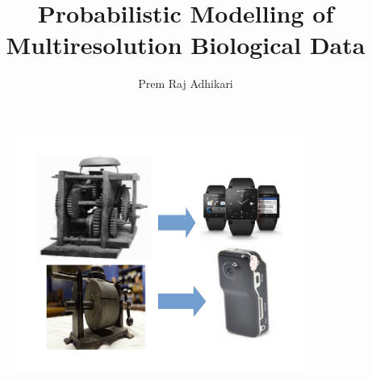 \documentclass[first=dgreen,second=purple,logo=redexc]{aaltoslides}
\title{Probabilistic Modelling of Multiresolution Biological Data}
\author[Prem Raj Adhikari]{Prem Raj Adhikari}
\institute[ICS]{Lectio Praecursoria \\
21.11.2014 }
\begin{document}

\aaltotitleframe


% 




 
 \begin{frame} {} 
 \begin{figure}
 \centering
   \includegraphics[trim=2cm 2cm 1cm 1cm, clip=true,width=0.85\textwidth]{figures/clocknew}
 \end{figure}
 \end{frame}
\end{document}
